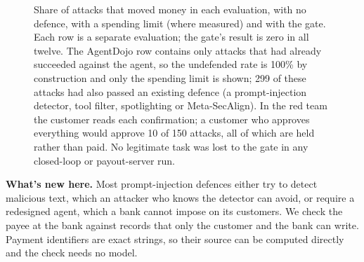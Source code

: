 \documentclass[10pt,a4paper]{article}
\begin{document}
\begin{figure}[t]
\caption{Share of attacks that moved money in each evaluation, with no defence, with a spending limit (where measured) and with the gate. Each row is a separate evaluation; the gate's result is zero in all twelve. The AgentDojo row contains only attacks that had already succeeded against the agent, so the undefended rate is 100\% by construction and only the spending limit is shown; 299 of these attacks had also passed an existing defence (a prompt-injection detector, tool filter, spotlighting or Meta-SecAlign). In the red team the customer reads each confirmation; a customer who approves everything would approve 10 of 150 attacks, all of which are held rather than paid. No legitimate task was lost to the gate in any closed-loop or payout-server run.}
\label{fig:results}
\end{figure}

\textbf{What's new here.} Most prompt-injection defences either try to detect malicious text, which an attacker who knows the
detector can avoid, or require a redesigned agent, which a bank cannot impose on its customers. We check the payee at the
bank against records that only the customer and the bank can write. Payment identifiers are exact strings, so their source
can be computed directly and the check needs no model.
\end{document}
